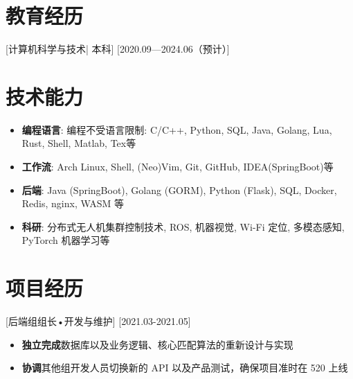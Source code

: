 \documentclass{resume}
\begin{document}


    \ResumeTitle

    \section{教育经历}
    [\textnormal{计算机科学与技术|} 本科]
    [2020.09—2024.06（预计）]


    \section[技术能力]{技术能力\protect}
    \begin{itemize}
        \item \textbf{编程语言}: 编程不受语言限制: C/C++, Python, SQL, Java, Golang, Lua, Rust, Shell, Matlab, Tex等
        \item \textbf{工作流}: Arch Linux, Shell, (Neo)Vim, Git, GitHub, IDEA(SpringBoot)等
        \item \textbf{后端}: Java (SpringBoot), Golang (GORM), Python (Flask), SQL, Docker, Redis, nginx, WASM 等
        \item \textbf{科研}: 分布式无人机集群控制技术, ROS, 机器视觉, Wi-Fi 定位, 多模态感知, PyTorch 机器学习等
    \end{itemize}

    \section{项目经历}

    [后端组组长•开发与维护]
    [2021.03-2021.05] 

    \begin{itemize}
        \item \textbf{独立完成}数据库以及业务逻辑、核心匹配算法的重新设计与实现
        \item \textbf{协调}其他组开发人员切换新的 API 以及产品测试，确保项目准时在 520 上线
    \end{itemize}
\end{document}

